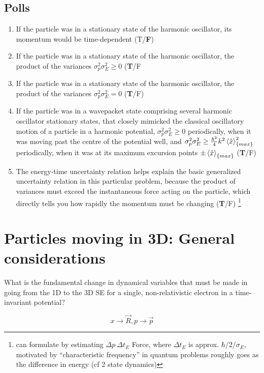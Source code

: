 \documentclass{article}
\begin{document}
\subsection{Polls}

\begin{enumerate}
    \item  If the particle was in a stationary state of the harmonic oscillator, its momentum would be time-dependent (T/\textbf{F})
    \item  If the particle was in a stationary state of the harmonic oscillator, the product of the variances $\sigma_p^2 \sigma_E^2 \geq 0$ (\textbf{T}/F
    \item  If the particle was in a stationary state of the harmonic oscillator, the product of the variances  $\sigma_p^2 \sigma_E^2 = 0$ (\textbf{T}/F)
    \item If the particle was in a wavepacket state comprising several harmonic oscillator stationary states, that closely mimicked the classical oscillatory motion of a particle in a harmonic potential,  $\sigma_p^2 \sigma_E^2 \geq 0$ periodically, when it was moving past the centre of the potential well, and  $\sigma_p^2 \sigma_E^2 \geq \frac{\hbar^2}{4} k^2 \braket{\hat{x}}^2_{\{max\}}$ periodically, when it was at its maximum excursion points $\pm \braket{\hat{x}}_{\{max\}}$  (\textbf{T}/F)
    \item The energy-time uncertainty relation helps explain the basic generalized uncertainty relation in this particular problem, because the product of variances must exceed the instantaneous force acting on the particle, which directly tells you how rapidly the momentum must be changing (\textbf{T}/F) \footnote{can formulate by estimating $\Delta p~ \Delta t_E$ Force, where $\Delta t_E$ is approx. $\hbar/2/\sigma_E$, motivated by “characteristic frequency” in quantum problems roughly goes as the difference in energy (cf 2 state dynamics)}

\end{enumerate}

\section{Particles moving in 3D: General considerations}

What is the fundamental change in dynamical variables that must be made in going from the 1D to the 3D SE for a single, non-relativistic electron in a time-invariant potential?

$$x \rightarrow \vec{R}, p \rightarrow \vec{p}$$
\end{document}
